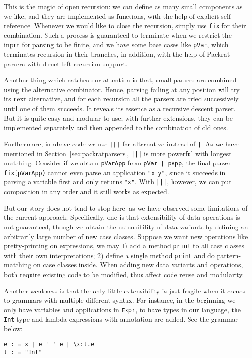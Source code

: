 This is the magic of open recursion: we can define as many small components as we like, and they are implemented as functions, with the help of explicit self-reference. Whenever we would like to close the recursion, simply use \lstinline{fix} for their combination. Such a process is guaranteed to terminate when we restrict the input for parsing to be finite, and we have some base cases like \lstinline{pVar}, which terminates recursion in their branches, in addition, with the help of Packrat parsers with direct left-recursion support.

Another thing which catches our attention is that, small parsers are combined using the alternative combinator. Hence, parsing failing at any position will try its next alternative, and for each recursion all the parsers are tried successively until one of them succeeds. It reveals its essence as a recursive descent parser. But it is quite easy and modular to use; with further extensions, they can be implemented separately and then appended to the combination of old ones.

Furthermore, in above code we use \lstinline{|||} for alternative instead of \lstinline{|}. As we have mentioned in Section~\ref{sec:packratparsers}, \lstinline{|||} is more powerful with longest matching. Consider if we obtain \lstinline{pVarApp} from \lstinline{pVar | pApp}, the final parser \lstinline{fix(pVarApp)} cannot even parse an application \lstinline{"x y"}, since it succeeds in parsing a variable first and only returns \lstinline{"x"}. With \lstinline{|||}, however, we can put composition in any order and it still works as expected.

But our story does not tend to stop here, as we have observed some limitations of the current approach. Specifically, one is that extensibility of data operations is not guaranteed, though we obtain the extensibility of data variants by defining an arbitrarily large number of new case classes. Suppose we want new operations like pretty-printing on expressions, we may 1) add a method \lstinline{print} to all case classes with their own interpretations; 2) define a single method \lstinline{print} and do pattern-matching on case classes inside. When adding new data variants and operations, both require existing code to be modified, thus affect code reuse and modularity.

Another weakness is that the only little extensibility is just fragile when it comes to grammars with multiple different syntax. For instance, in the beginning we only have variables and applications in \lstinline{Expr}, to have types in our language, the \lstinline{Int} type and lambda expressions with annotation are added. See the grammar below:
\begin{lstlisting}
e ::= x | e ' ' e | \x:t.e
t ::= "Int"
\end{lstlisting}

